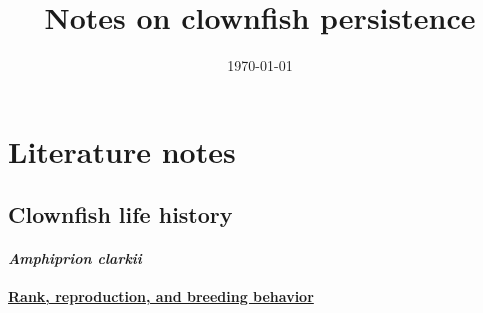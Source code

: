\documentclass[12pt, oneside]{article}   	%
\title{Notes on clownfish persistence}
\begin{document}
\date{\today}
\maketitle{}
\section*{Literature notes}

\subsection*{Clownfish life history}
\paragraph*{\textit{Amphiprion clarkii}}
\textbf{\underline{Rank, reproduction, and breeding behavior}}
\end{document}
